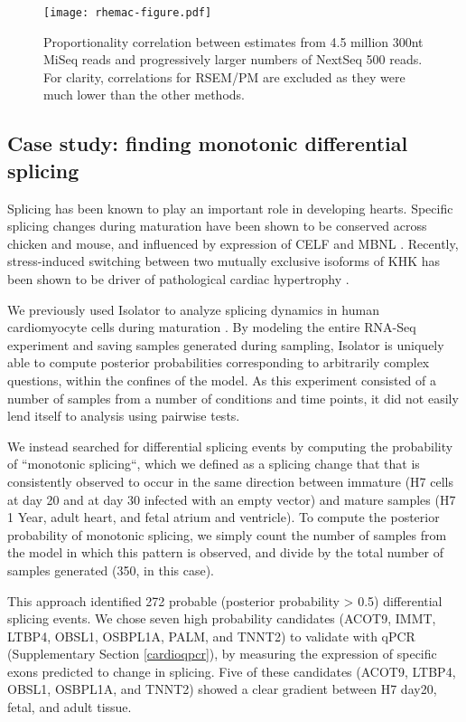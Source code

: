 \documentclass[twocolumn]{article}
\begin{document}
\begin{figure}
\texttt{[image: rhemac-figure.pdf]}
\caption{Proportionality correlation between estimates from 4.5 million 300nt
MiSeq reads and progressively larger numbers of NextSeq 500 reads. For clarity,
correlations for RSEM/PM are excluded as they were much lower than the other
methods.}
\label{fig:rhemac}
\end{figure}

\subsection{Case study: finding monotonic differential splicing}\label{finding-monotonic-differential-splicing}

Splicing has been known to play an important role in developing hearts. Specific
splicing changes during maturation have been shown to be conserved across
chicken and mouse, and influenced by expression of CELF and MBNL
\cite{Kalsotra:2008ke}. Recently, stress-induced switching between two mutually
exclusive isoforms of KHK has been shown to be driver of pathological cardiac
hypertrophy \cite{Mirtschink:2015iq}.

We previously used Isolator to analyze splicing dynamics in human cardiomyocyte
cells during maturation \cite{Kuppusamy:2015ey}. By modeling the entire RNA-Seq
experiment and saving samples generated during sampling, Isolator is uniquely
able to compute posterior probabilities corresponding to arbitrarily complex
questions, within the confines of the model. As this experiment consisted of
a number of samples from a number of conditions and time points, it did not
easily lend itself to analysis using pairwise tests.

We instead searched for differential splicing events by computing the
probability of ``monotonic splicing``, which we defined as a splicing change
that that is consistently observed to occur in the same direction
between immature (H7 cells at day 20 and at day 30 infected with an empty
vector) and mature samples (H7 1 Year, adult heart, and fetal atrium and
ventricle). To compute the posterior probability of monotonic splicing, we
simply count the number of samples from the model in which this pattern is
observed, and divide by the total number of samples generated (350, in this
case).

This approach identified 272 probable (posterior probability > 0.5) differential
splicing events. We chose seven high probability candidates (ACOT9, IMMT, LTBP4,
OBSL1, OSBPL1A, PALM, and TNNT2) to validate with qPCR (Supplementary Section
\ref{cardioqpcr}), by measuring the expression of specific exons predicted to
change in splicing. Five of these candidates (ACOT9, LTBP4, OBSL1, OSBPL1A, and
TNNT2) showed a clear gradient between H7 day20, fetal, and adult tissue.
\end{document}
